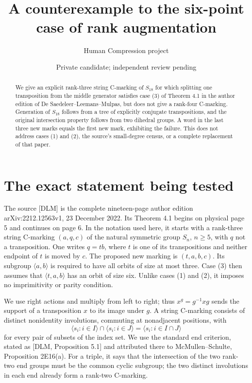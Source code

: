 \documentclass[a4paper,11pt]{article}
\title{A counterexample to the six-point case of rank augmentation}
\author{Human Compression project}\date{Private candidate; independent review pending}
\newcommand{\gen}[1]{\langle#1\rangle}
\begin{document}
\maketitle
\begin{abstract}
We give an explicit rank-three string C-marking of $S_{18}$ for which
splitting one transposition from the middle generator satisfies case (3)
of Theorem 4.1 in the author edition of De Saedeleer--Leemans--Mulpas,
but does not give a rank-four C-marking. Generation of $S_{18}$ follows
from a tree of explicitly conjugate transpositions, and the original
intersection property follows from two dihedral groups. A word in the
last three new marks equals the first new mark, exhibiting the failure.
This does not address cases (1) and (2), the source's small-degree census,
or a complete replacement of that paper.
\end{abstract}

\section{The exact statement being tested}
The source [DLM] is the complete nineteen-page author edition
arXiv:2212.12563v1, 23 December 2022. Its Theorem 4.1 begins on physical
page 5 and continues on page 6. In the notation used here, it starts with
a rank-three string C-marking $(a,q,c)$ of the natural symmetric group
$S_n$, $n\geq5$, with $q$ not a transposition. One writes $q=tb$, where
$t$ is one of its transpositions and neither endpoint of $t$ is moved by
$c$. The proposed new marking is $(t,a,b,c)$. Its subgroup $\gen{a,b}$
is required to have all orbits of size at most three. Case (3) then assumes
that $\gen{t,a,b}$ has an orbit of size six. Unlike cases (1) and (2),
it imposes no imprimitivity or parity condition.

We use right actions and multiply from left to right; thus
$x^g=g^{-1}xg$ sends the support of a transposition $x$ to its image under
$g$. A string C-marking consists of distinct nonidentity involutions,
commuting at nonadjacent positions, with
\[
 \gen{s_i:i\in I}\cap\gen{s_i:i\in J}
 =\gen{s_i:i\in I\cap J}
\]
for every pair of subsets of the index set. We use the standard end
criterion, stated as [DLM, Proposition 5.1] and attributed there to
McMullen--Schulte, Proposition 2E16(a). For a triple, it says that the
intersection of the two rank-two end groups must be the common cyclic
subgroup; the two distinct involutions in each end already form a
rank-two C-marking.
\end{document}
